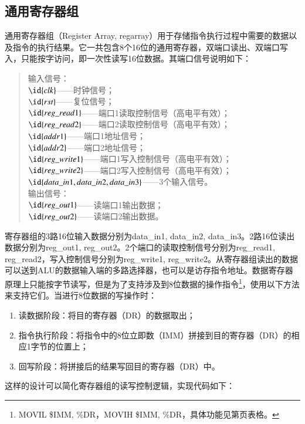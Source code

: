 \documentclass[titlepage, 11pt]{article}
\begin{document}
	\subsection{通用寄存器组}
		通用寄存器组（Register Array, regarray）用于存储指令执行过程中需要的数据以及指令的执行结果。它一共包含8个16位的通用寄存器，双端口读出、双端口写入，只能按字访问，即一次性读写16位数据。其端口信号说明如下：
		\begin{quote}
			输入信号：\\
			$\id{clk}$——时钟信号；\\
			$\id{rst}$——复位信号；\\
			$\id{reg\_read1}$——端口1读取控制信号（高电平有效）；\\
			$\id{reg\_read2}$——端口2读取控制信号（高电平有效）；\\
			$\id{addr1}$——端口1地址信号；\\
			$\id{addr2}$——端口2地址信号；\\
			$\id{reg\_write1}$——端口1写入控制信号（高电平有效）；\\
			$\id{reg\_write2}$——端口2写入控制信号（高电平有效）；\\
			$\id{data\_in1,data\_in2,data\_in3}$——3个输入信号。\\
			输出信号：\\
			$\id{reg\_out1}$——读端口1输出数据；\\
			$\id{reg\_out2}$——读端口2输出数据。	
		\end{quote}\par 
		寄存器组的3路16位输入数据分别为data\_in1, data\_in2, data\_in3。2路16位读出数据分别为reg\_out1, reg\_out2。2个端口的读取控制信号分别为reg\_read1, reg\_read2，写入控制信号分别为reg\_write1, reg\_write2。从寄存器组读出的数据可以送到ALU的数据输入端的多路选择器，也可以是访存指令地址。数据寄存器原理上只能按字节读写，但是为了支持涉及到8位数据的操作指令\footnote{MOVIL \$IMM, \%DR，MOVIH \$IMM, \%DR，具体功能见第页表格。}，使用以下方法来支持它们。当进行8位数据的写操作时：
		\begin{enumerate}
			\item 读数据阶段：将目的寄存器（DR）的数据取出；
			\item 指令执行阶段：将指令中的8位立即数（IMM）拼接到目的寄存器（DR）的相应1字节的位置上；
			\item 回写阶段：将拼接后的结果写回目的寄存器（DR）中。
		\end{enumerate}
		\par 这样的设计可以简化寄存器组的读写控制逻辑，实现代码如下：
\end{document}

